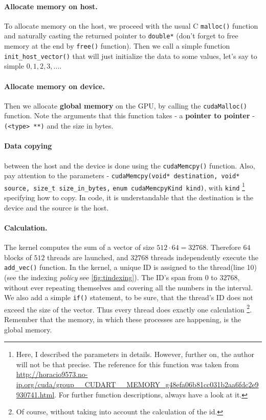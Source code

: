 \paragraph{Allocate memory on host.} To allocate memory on the host, 
we proceed with the usual C \verb|malloc()| function and naturally 
casting the returned pointer to \verb|double*| (don't forget 
to free memory at the end by \verb|free()| function). 
Then we call a simple function \verb|init_host_vector()| that will just initialize the data 
to some values, let's say to simple $0,1,2,3, ...$. 
\paragraph{Allocate memory on device.} Then we allocate \textbf{global memory} on the GPU, 
by calling the \verb|cudaMalloc()| function. Note the arguments that this function takes - 
a \textbf{pointer to pointer} - \verb|(<type> **)| and the size in bytes. 

 
\paragraph{Data copying} between the host and the device is done using the \verb|cudaMemcpy()| function. Also, pay attention 
to the parameters - 
\verb|cudaMemcpy(void* destination, void* source, size_t size_in_bytes,| \newline \verb|enum cudaMemcpyKind kind)|,
with \verb|kind| \footnote{Here, I described the parameters in details. However, further on,
the author will not be that precise. The reference for this function was taken from 
\url{http://horacio9573.no-ip.org/cuda/group__CUDART__MEMORY_g48efa06b81cc031b2aa6fdc2e9930741.html}. 
For further function descriptions, always have a look at it.}
specifying how to copy. In code, it is understandable that the destination is the 
device and the source is the host.

\vspace{-0.8cm}
\paragraph{Calculation.} The kernel computes the sum of a vector of size $512\cdot 64 = 32768$. 
Therefore $64$ blocks of $512$ threads are launched, and $32768$ threads independently execute the \verb|add_vec()|
function. In the kernel, a unique ID is assigned to the thread(line 10) (see the indexing \textit{policy}  see \ref{fig:tindexing}). 
The ID's span from $0$ to $32768$, without ever repeating themselves and covering all the numbers in the interval.
We also add a simple \verb|if()| statement, to be sure, that the thread's ID does not exceed the size of the vector.
Thus every thread does exactly one calculation \footnote{Of course, without taking into account the calculation of the id.}.
Remember that the memory, in which these processes are happening, is the global memory. 

